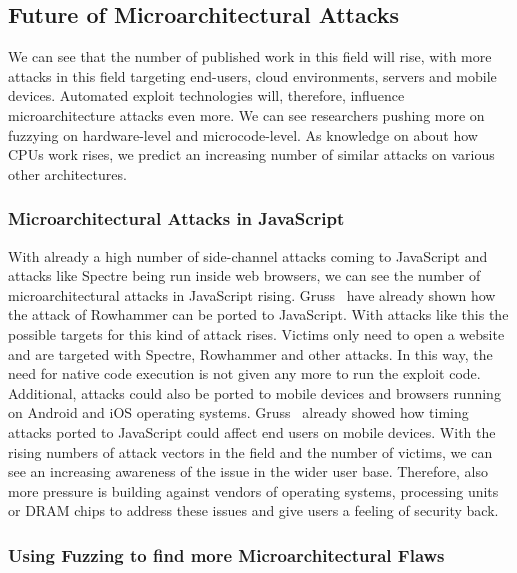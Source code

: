 \subsection{Future of Microarchitectural Attacks}

We can see that the number of published work in this field will rise, with more
attacks in this field targeting end-users, cloud environments, servers and
mobile devices. Automated exploit technologies will, therefore, influence
microarchitecture attacks even more. We can see researchers pushing more on
fuzzying on hardware-level and microcode-level. As knowledge on about how CPUs
work rises, we predict an increasing number of similar attacks on various other
architectures.

\subsubsection{Microarchitectural Attacks in JavaScript}

With already a high number of side-channel attacks coming to JavaScript and
attacks like Spectre being run inside web browsers, we can see the number of
microarchitectural attacks in JavaScript rising. Gruss~\etal\cite{rowhammerjs}
have already shown how the attack of Rowhammer can be ported to JavaScript. With
attacks like this the possible targets for this kind of attack rises. Victims
only need to open a website and are targeted with Spectre, Rowhammer and other
attacks. In this way, the need for native code execution is not given any more
to run the exploit code. Additional, attacks could also be ported to mobile
devices and browsers running on Android and iOS operating systems.
Gruss~\etal\cite{keytimejs} already showed how timing attacks ported to
JavaScript could affect end users on mobile devices. With the rising numbers of
attack vectors in the field and the number of victims, we can see an increasing
awareness of the issue in the wider user base. Therefore, also more pressure is
building against vendors of operating systems, processing units or DRAM chips to
address these issues and give users a feeling of security back.

\subsubsection{Using Fuzzing to find more Microarchitectural Flaws}

